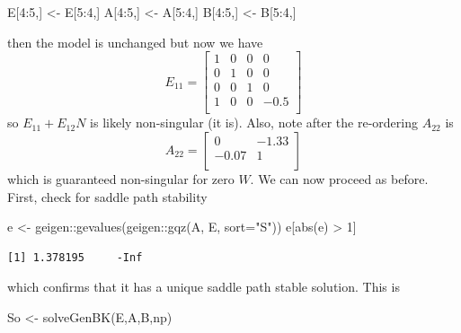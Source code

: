 \documentclass[
  letterpaper,
]{book}
\newenvironment{Shaded}{\begin{snugshade}}{\end{snugshade}}
\newcommand{\AttributeTok}[1]{\textcolor[rgb]{0.40,0.45,0.13}{#1}}
\newcommand{\DecValTok}[1]{\textcolor[rgb]{0.68,0.00,0.00}{#1}}
\newcommand{\FunctionTok}[1]{\textcolor[rgb]{0.28,0.35,0.67}{#1}}
\newcommand{\NormalTok}[1]{\textcolor[rgb]{0.00,0.23,0.31}{#1}}
\newcommand{\OtherTok}[1]{\textcolor[rgb]{0.00,0.23,0.31}{#1}}
\newcommand{\SpecialCharTok}[1]{\textcolor[rgb]{0.37,0.37,0.37}{#1}}
\newcommand{\StringTok}[1]{\textcolor[rgb]{0.13,0.47,0.30}{#1}}
\begin{document}
\begin{Shaded}
\begin{Highlighting}[]
\NormalTok{E[}\DecValTok{4}\SpecialCharTok{:}\DecValTok{5}\NormalTok{,] }\OtherTok{\textless{}{-}}\NormalTok{ E[}\DecValTok{5}\SpecialCharTok{:}\DecValTok{4}\NormalTok{,]}
\NormalTok{A[}\DecValTok{4}\SpecialCharTok{:}\DecValTok{5}\NormalTok{,] }\OtherTok{\textless{}{-}}\NormalTok{ A[}\DecValTok{5}\SpecialCharTok{:}\DecValTok{4}\NormalTok{,]}
\NormalTok{B[}\DecValTok{4}\SpecialCharTok{:}\DecValTok{5}\NormalTok{,] }\OtherTok{\textless{}{-}}\NormalTok{ B[}\DecValTok{5}\SpecialCharTok{:}\DecValTok{4}\NormalTok{,]}
\end{Highlighting}
\end{Shaded}

then the model is unchanged but now we have \[  
E_{11} = \left[\begin{matrix}1 &0 &0 &0 \\0 &1 &0 &0 \\0 &0 &1 &0 \\1 &0 &0 &-0.5 \\\end{matrix}\right] 
\] so \(E_{11} + E_{12}N\) is likely non-singular (it is). Also, note
after the re-ordering \(A_{22}\) is \[  
A_{22} = \left[\begin{matrix}0 &-1.33 \\-0.07 &1 \\\end{matrix}\right] 
\] which is guaranteed non-singular for zero \(W\). We can now proceed
as before. First, check for saddle path stability

\begin{Shaded}
\begin{Highlighting}[]
\NormalTok{e }\OtherTok{\textless{}{-}}\NormalTok{ geigen}\SpecialCharTok{::}\FunctionTok{gevalues}\NormalTok{(geigen}\SpecialCharTok{::}\FunctionTok{gqz}\NormalTok{(A, E, }\AttributeTok{sort=}\StringTok{"S"}\NormalTok{))}
\NormalTok{e[}\FunctionTok{abs}\NormalTok{(e) }\SpecialCharTok{\textgreater{}} \DecValTok{1}\NormalTok{]}
\end{Highlighting}
\end{Shaded}

\begin{verbatim}
[1] 1.378195     -Inf
\end{verbatim}

which confirms that it has a unique saddle path stable solution. This is

\begin{Shaded}
\begin{Highlighting}[]
\NormalTok{So }\OtherTok{\textless{}{-}} \FunctionTok{solveGenBK}\NormalTok{(E,A,B,np)}
\end{Highlighting}
\end{Shaded}
\end{document}
